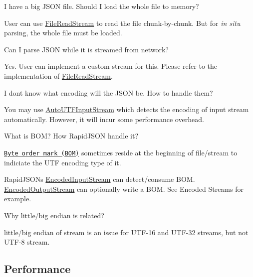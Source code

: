 \begin{DoxyEnumerate}
\item I have a big J\+S\+ON file. Should I load the whole file to memory?

User can use {\ttfamily \hyperlink{class_file_read_stream}{File\+Read\+Stream}} to read the file chunk-\/by-\/chunk. But for {\itshape in situ} parsing, the whole file must be loaded.
\item Can I parse J\+S\+ON while it is streamed from network?

Yes. User can implement a custom stream for this. Please refer to the implementation of {\ttfamily \hyperlink{class_file_read_stream}{File\+Read\+Stream}}.
\item I don\textquotesingle{}t know what encoding will the J\+S\+ON be. How to handle them?

You may use {\ttfamily \hyperlink{class_auto_u_t_f_input_stream}{Auto\+U\+T\+F\+Input\+Stream}} which detects the encoding of input stream automatically. However, it will incur some performance overhead.
\item What is B\+OM? How Rapid\+J\+S\+ON handle it?

\href{http://en.wikipedia.org/wiki/Byte_order_mark}{\tt Byte order mark (B\+OM)} sometimes reside at the beginning of file/stream to indiciate the U\+TF encoding type of it.

Rapid\+J\+S\+ON\textquotesingle{}s {\ttfamily \hyperlink{class_encoded_input_stream}{Encoded\+Input\+Stream}} can detect/consume B\+OM. {\ttfamily \hyperlink{class_encoded_output_stream}{Encoded\+Output\+Stream}} can optionally write a B\+OM. See Encoded Streams for example.
\item Why little/big endian is related?

little/big endian of stream is an issue for U\+T\+F-\/16 and U\+T\+F-\/32 streams, but not U\+T\+F-\/8 stream.
\end{DoxyEnumerate}

\subsection*{Performance}


